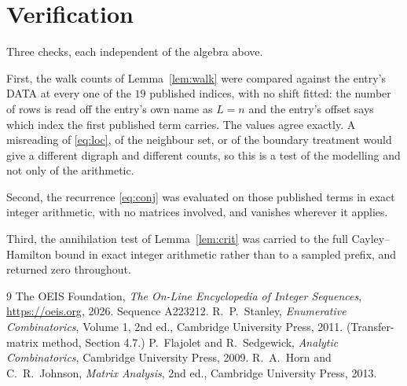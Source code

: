 \documentclass[11pt,a4paper]{article}
\theoremstyle{plain}
\theoremstyle{definition}
\begin{document}
\section{Verification}

Three checks, each independent of the algebra above.

First, the walk counts of Lemma~\ref{lem:walk} were compared against the entry's DATA at
every one of the $19$ published indices, with no shift fitted: the number of rows is
read off the entry's own name as $L=n$ and the entry's offset says which index the first
published term carries. The values agree exactly. A misreading of \eqref{eq:loc}, of the
neighbour set, or of the boundary treatment would give a different digraph and different
counts, so this is a test of the modelling and not only of the arithmetic.

Second, the recurrence \eqref{eq:conj} was evaluated on those published terms in exact
integer arithmetic, with no matrices involved, and vanishes wherever it applies.

Third, the annihilation test of Lemma~\ref{lem:crit} was carried to the full
Cayley--Hamilton bound in exact integer arithmetic rather than to a sampled prefix, and
returned zero throughout.

\begin{thebibliography}{9}
 The OEIS Foundation, \emph{The On-Line Encyclopedia of Integer
Sequences}, \url{https://oeis.org}, 2026. Sequence A223212.
 R.~P.~Stanley, \emph{Enumerative Combinatorics}, Volume 1, 2nd ed.,
Cambridge University Press, 2011. (Transfer-matrix method, Section 4.7.)
 P.~Flajolet and R.~Sedgewick, \emph{Analytic Combinatorics}, Cambridge
University Press, 2009.
 R.~A.~Horn and C.~R.~Johnson, \emph{Matrix Analysis}, 2nd ed., Cambridge
University Press, 2013.
\end{thebibliography}
\end{document}
